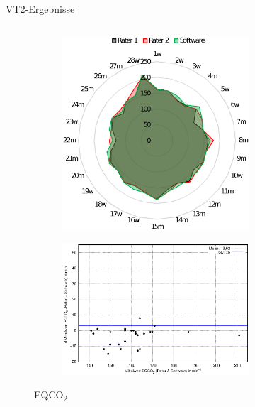 \documentclass[colorBG,slideColor,8pt]{beamer}
\newcommand{\eqcotwo}{EQCO\textsubscript{2}}
\begin{document}
\begin{frame}[fragile]{VT2-Ergebnisse}
\begin{columns}
	\begin{column}{0.5\linewidth}
		\begin{figure}
			\begin{subfigure}{0.9\linewidth}
				\centering
				\includegraphics[width=0.6\linewidth]{Bilder/eqco2_net.eps}
			\end{subfigure}
			\begin{subfigure}{0.9\linewidth}
				\centering
				\includegraphics[width=0.82\linewidth]{Bilder/eqco2.eps}
			\end{subfigure}	
		\caption{\eqcotwo}	
		\end{figure}
	\end{column}
	\begin{column}{0.5\linewidth}
		\begin{figure}
			\begin{subfigure}{0.9\linewidth}
				\centering

\end{subfigure}
\end{figure}
\end{column}
\end{columns}
\end{frame}
\end{document}
